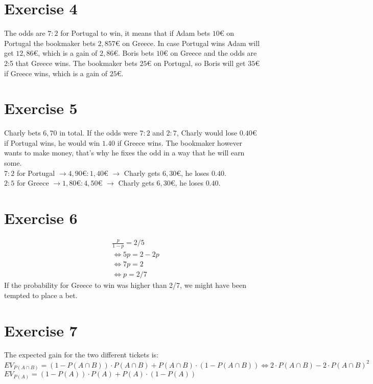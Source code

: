 \section*{Exercise 4}
The odds are $7 : 2$ for Portugal to win, it means that if Adam bets $10\euro$ on Portugal the bookmaker bets $2,857€$ on Greece. In case Portugal wins Adam will get $12,86€$, which is a gain of $2,86€$.
Boris bets $10€$ on Greece and the odds are 2:5 that Greece wins. The bookmaker bets $25€$ on Portugal, so Boris will get $35€$ if Greece wins, which is a gain of $25€$.

\section*{Exercise 5}
Charly bets $6,70$ in total.
If the odds were $7 : 2$ and $2 : 7$, Charly would lose $0.40€$ if Portugal wins, he would win $1.40$ if Greece wins. The bookmaker however wants to make money, that's why he fixes the odd in a way that he will earn some.\\
$7 : 2$ for Portugal $\rightarrow 4,90€ : 1,40€$ $\rightarrow$ Charly gets $6,30€$, he loses $0.40$.\\
$2 : 5$ for Greece $\rightarrow 1,80€ : 4,50€$ $\rightarrow$ Charly gets $6,30€$, he loses $0.40$.

\section*{Exercise 6}
\begin{align*}
& \frac{p}{1-p} = 2/5\\
& \Leftrightarrow 5p = 2 - 2p\\
& \Leftrightarrow 7p = 2\\
& \Leftrightarrow p = 2/7
\end{align*}
If the probability for Greece to win was higher than 2/7, we might have been tempted to place a bet.

\section*{Exercise 7}
The expected gain for the two different tickets is:\\
$EV_{P(A \cap B)} = (1 - P(A \cap B)) \cdot P(A \cap B) + P(A \cap B) \cdot (1 - P(A \cap B)) \Leftrightarrow 2 \cdot P(A \cap B) - 2 \cdot P(A \cap B)^2$ \\
$EV_{P(A)} = (1 - P(A)) \cdot P(A) + P(A) \cdot (1 - P(A))$



